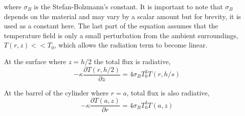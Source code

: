 	where $\sigma_B$ is the Stefan-Bolzmann's constant.  It is important to note that $\sigma_B$ depends on the material and may vary by a scalar amount but for brevity, it is used as a constant here.  The last part of the equation assumes that the temperature field is only a small perturbation from the ambient surroundings, $T(r,z) << T_0$, which allows the radiation term to become linear.
	
	At the surface where $z=h/2$ the total flux is radiative,
	\begin{equation}\label{eq:faceh2}
	-\kappa \frac{\partial T(r,h/2)}{\partial z} = 4 \sigma_B T_0^3 T(r,h/s)
	\end{equation}
	
	At the barrel of the cylinder where $r=a$, total flux is also radiative,
	\begin{equation}\label{eq:barrel}
	-\kappa \frac{\partial T(a,z)}{\partial r} = 4 \sigma_B  T_0^3 T(a,z)
	\end{equation}
	
